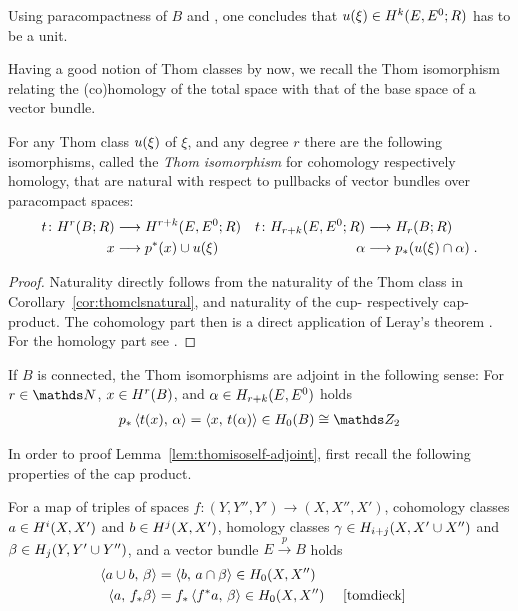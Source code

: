 \begin{Rem}
  Using paracompactness of $B$ and
  \cite[Proposition~17.9.6]{tomdieck}, one concludes that
  ${u}(\xi)\in H^{k}(E, {E}^0;R)$ has to be a unit.
\end{Rem}

Having a good notion of Thom classes by now, we recall the Thom
isomorphism relating the (co)homology of the total space with that of the base
space of a vector bundle.
\begin{Thm}
  For any Thom class ${u}(\xi)$ of $\xi$, and any degree $r$ there are
  the following isomorphisms, called the \emph{Thom isomorphism} for
  cohomology respectively homology,
  that are natural with respect to pullbacks of vector bundles over
  paracompact spaces:
  \begin{align*}
    t\colon
    H^r(B;R) &\longrightarrow H^{r+k}(E, {E}^0; R)
    & t\colon
      H_{r+k}(E, {E}^0; R) &\longrightarrow H_r(B;R)
    \\
    x &\longrightarrow {p}^* (x) \cup {u}(\xi)
    & \alpha &\longrightarrow {p}_* ({u}(\xi) \cap \alpha)
               \;.
  \end{align*}
  \begin{proof}
    Naturality directly follows from the naturality of the Thom class
    in Corollary~\ref{cor:thomclsnatural}, and naturality of the cup-
    respectively cap-product.
    The cohomology part then is a direct application of Leray's theorem
    \cite[Theorem~4D.8]{hatcher}.
    For the homology part see \forexample \cite[Theorem~14.6]{switzer}.
  \end{proof}
\end{Thm}
\begin{Lem}\label{lem:thomisoself-adjoint}
  If $B$ is connected, the Thom isomorphisms are adjoint in the
  following sense:
  For $r\in\Nat$, $x\in H^r(B)$,
  and $\alpha\in H_{r+k}(E, {E}^0)$  holds 
  \begin{gather*}
    \pf p\capped{\thomiso(x)}{\alpha} = \capped{x}{\thomiso(\alpha)}
    \in\H_0(B)\cong \Zmod2
  \end{gather*}
\end{Lem}
In order to proof Lemma~\ref{lem:thomisoself-adjoint},
first recall the following properties of the cap product.
\begin{Rem}
  For
  a map of triples of spaces
  $f\colon (Y,Y'',Y')\to (X,X'',X')$,
  cohomology classes
  $a\in H^i(X,X')$ and $b\in H^j(X,X')$,
  homology classes
  $\gamma\in H_{i+j}(X, X'\cup X'')$
  and
  $\beta\in H_j(Y, Y'\cup Y'')$,
  and a vector bundle $E\xrightarrow{p}B$
  holds
  \begin{align}
    \label{eq:capprod1}
    \capped{a\cup b}{\beta} &= \capped{b}{a\cap\beta}
                              \in \H_0(X,X'')\\
    \label{eq:capprod2}
    \capped{a}{\pf f \beta} &= \pf f \capped{\pb f a}{\beta}
                              \in \H_0(X,X'')
                            &&\text{
                               \cite[Sec.~18.1.1]{tomdieck}}
  \end{align}
\end{Rem}
